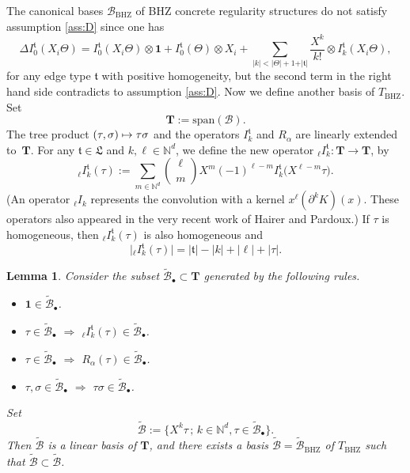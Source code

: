 \documentclass[JEP,XML,SOM,Unicode,published]{cedram}
\newcommand\mto{\mathchoice{\longmapsto}{\mapsto}{\mapsto}{\mapsto}}
\newcommand{\sbullet}{{\scriptscriptstyle\bullet}}
\theoremstyle{plain}
\newtheorem{lem}[thm]{Lemma}
\theoremstyle{definition}
\newcommand{\unit}{\mathbf{1}}
\newcommand{\BHZ}{{\scriptscriptstyle\mathrm{BHZ}}}
\newcommand{\bsT}{\boldsymbol{T}}
\newcommand{\bsmcB}{\boldsymbol{\mathcal{B}}}
\newcommand{\frkL}{\mathfrak{L}}
\newcommand{\frkt}{\mathfrak{t}}
\newcommand{\bbN}{\mathbb{N}}
\newcommand{\mcB}{\mathcal{B}}
\begin{document}
The canonical bases $\mcB_{\BHZ}$ of BHZ concrete regularity structures do not satisfy assumption \eqref{ass:D} since one has
\[
\Delta I^{\frkt}_0(X_i\Theta) = I^{\frkt}_0(X_i\Theta)\otimes\unit + I^{\frkt}_0(\Theta)\otimes X_i + \sum_{\vert k\vert< \vert\Theta\vert+1+\vert\frkt\vert}\frac{X^k}{k!}\otimes I^{\frkt}_k(X_i\Theta),
\]
for any edge type $\frkt$ with positive homogeneity, but the second term in the right hand side contradicts to assumption \eqref{ass:D}.
Now we define another basis of $T_{\BHZ}$. Set\vspace*{-3pt}
\[
\bsT := \textrm{span}(\bsmcB).
\]
The tree product $(\tau,\sigma)\mto\tau\sigma$ and the operators $I_k^\frkt$ and $R_\alpha$ are linearly extended to~$\bsT$. For any $\frkt\in\frkL$ and $k,\ell\in\bbN^d$, we define the new operator ${}_\ell I_k^\frkt:\bsT\to \bsT$, by\vspace*{-3pt}
\[
{}_\ell I_k^\frkt(\tau) := \sum_{m\in\bbN^d}\binom{\ell}{m}X^m(-1)^{\ell-m}I_k^\frkt\bigl(X^{\ell-m}\tau\bigr).
\]
(An operator ${}_\ell I_k$ represents the convolution with a kernel $x^\ell(\partial^k K)(x)$. These oper\-ators also appeared in the very recent work \cite{HP19} of Hairer and Pardoux.) If $\tau$ is homogeneous, then ${}_\ell I_k^\frkt(\tau)$ is also homogeneous and\vspace*{-3pt}
\[
\big|{}_\ell I_k^\frkt(\tau)\big| = |\frkt| - |k| + |\ell | + |\tau|.
\]

\begin{lem}
Consider the subset $\widetilde{\bsmcB}_\sbullet\subset \bsT$ generated by the following rules.
\begin{itemize}
\item $\unit\in\widetilde{\bsmcB}_\sbullet$.
\item $\tau\in\widetilde{\bsmcB}_\sbullet$ $\Rightarrow$ ${}_\ell I_k^\frkt(\tau)\in\widetilde{\bsmcB}_\sbullet$.
\item $\tau\in\widetilde{\bsmcB}_\sbullet$ $\Rightarrow$ $R_\alpha(\tau)\in\widetilde{\bsmcB}_\sbullet$.
\item $\tau,\sigma\in\widetilde{\bsmcB}_\sbullet$ $\Rightarrow$ $\tau\sigma\in\widetilde{\bsmcB}_\sbullet$.
\end{itemize}
Set\vspace*{-3pt}
\[
\widetilde{\bsmcB} := \big\{X^k\tau\,;\, k\in\bbN^d, \tau\in\widetilde{\bsmcB}_\sbullet\big\}.
\]
Then $\widetilde{\bsmcB}$ is a linear basis of $\bsT$, and there exists a basis $\widetilde{\mcB}=\widetilde{\mcB}_{\BHZ}$ of $T_{\BHZ}$ such that $\widetilde{\mcB}\subset\widetilde{\bsmcB}$.
\end{lem}
\end{document}

